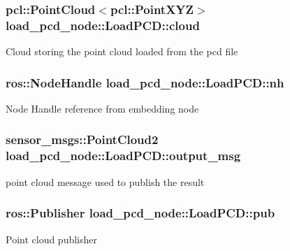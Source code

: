\subsubsection[{\texorpdfstring{cloud}{cloud}}]{\setlength{\rightskip}{0pt plus 5cm}pcl\+::\+Point\+Cloud$<$pcl\+::\+Point\+X\+YZ$>$ load\+\_\+pcd\+\_\+node\+::\+Load\+P\+C\+D\+::cloud\hspace{0.3cm}{\ttfamily [private]}}\hypertarget{classload__pcd__node_1_1_load_p_c_d_a43f6fe470fc4ef15e34fa79e4c91e620}{}\label{classload__pcd__node_1_1_load_p_c_d_a43f6fe470fc4ef15e34fa79e4c91e620}
Cloud storing the point cloud loaded from the pcd file 
\subsubsection[{\texorpdfstring{nh}{nh}}]{\setlength{\rightskip}{0pt plus 5cm}ros\+::\+Node\+Handle load\+\_\+pcd\+\_\+node\+::\+Load\+P\+C\+D\+::nh\hspace{0.3cm}{\ttfamily [private]}}\hypertarget{classload__pcd__node_1_1_load_p_c_d_a33ce71ddb911163b7bdc79cdf0fbb7b6}{}\label{classload__pcd__node_1_1_load_p_c_d_a33ce71ddb911163b7bdc79cdf0fbb7b6}
Node Handle reference from embedding node 
\subsubsection[{\texorpdfstring{output\+\_\+msg}{output_msg}}]{\setlength{\rightskip}{0pt plus 5cm}sensor\+\_\+msgs\+::\+Point\+Cloud2 load\+\_\+pcd\+\_\+node\+::\+Load\+P\+C\+D\+::output\+\_\+msg\hspace{0.3cm}{\ttfamily [private]}}\hypertarget{classload__pcd__node_1_1_load_p_c_d_acc6a98852ea5ac45864ccee88ba09193}{}\label{classload__pcd__node_1_1_load_p_c_d_acc6a98852ea5ac45864ccee88ba09193}
point cloud message used to publish the result 
\subsubsection[{\texorpdfstring{pub}{pub}}]{\setlength{\rightskip}{0pt plus 5cm}ros\+::\+Publisher load\+\_\+pcd\+\_\+node\+::\+Load\+P\+C\+D\+::pub\hspace{0.3cm}{\ttfamily [private]}}\hypertarget{classload__pcd__node_1_1_load_p_c_d_adfa7998324e0fcdc7764603ae08b10c2}{}\label{classload__pcd__node_1_1_load_p_c_d_adfa7998324e0fcdc7764603ae08b10c2}
Point cloud publisher 

